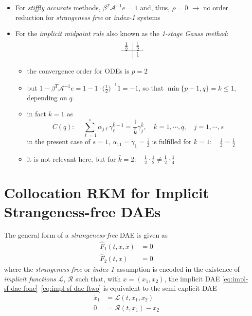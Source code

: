 \documentclass[]{book}
\providecommand{\tightlist}{%
  \setlength{\itemsep}{0pt}\setlength{\parskip}{0pt}}
\theoremstyle{definition}
\theoremstyle{definition}
\theoremstyle{definition}
\theoremstyle{remark}
\begin{document}
\begin{itemize}
\item
  For \emph{stiffly accurate} methods, \(\beta^T \mathcal A^{-1}e=1\) and, thus, \(\rho=0\) \(\rightarrow\) no order reduction for \emph{strangeness free} or \emph{index-1} systems
\item
  For the \emph{implicit midpoint rule} also known as the \emph{1-stage Gauss method}:
  \[
  \begin{array}{c|c}
  \frac 12 & \frac 12 \\
  \hline
   & 1  
  \end{array}
  \]

  \begin{itemize}
  \tightlist
  \item
    the convergence order for ODEs is \(p=2\)
  \item
    but \(1-\beta^T \mathcal A^{-1}e = 1- 1\cdot {\bigl(\frac 12\bigr)}^{-1} 1 = -1\), so that \(\min\{p-1, q\} = k \leq 1\), depending on \(q\).
  \item
    in fact \(k=1\) as
    \[
    C(q): \quad \sum_{\ell=1}^s\alpha_{j\ell}\gamma_\ell^{\bar k-1}=\frac{1}{\bar k} \gamma_j^{\bar k}, \quad {\bar k}=1,\cdots,q, \quad j=1,\cdots,s
    \]
    in the present case of \(s=1\), \(\alpha_{11}=\gamma_1=\frac 12\) is fulfilled for \({\bar k}=1: \quad \frac 12 = \frac 12\)
  \item
    it is not relevant here, but for \({\bar k}=2:\quad \frac 12 \cdot \frac 12 \neq \frac 12 \cdot \frac 14\)
  \end{itemize}
\end{itemize}

\hypertarget{collocation-rkm-for-implicit-strangeness-free-daes}{%
\section{Collocation RKM for Implicit Strangeness-free DAEs}\label{collocation-rkm-for-implicit-strangeness-free-daes}}

The general form of a \emph{strangeness-free} DAE is given as
\begin{align}
\hat F_1(t,x,\dot x) &= 0 \label{eq:impl-sf-dae-fone}\\
\hat F_2(t,x) &= 0 \label{eq:impl-sf-dae-ftwo}
\end{align}
where the \emph{strangeness-free} or \emph{index-1} assumption is encoded in the existence of \emph{implicit functions} \(\mathcal L\), \(\mathcal R\) such that, with \(x=(x_1,x_2)\), the implicit DAE \eqref{eq:impl-sf-dae-fone}--\eqref{eq:impl-sf-dae-ftwo} is equivalent to the semi-explicit DAE
\begin{align*}
  \dot x_1  &= \mathcal L(t,x_1,x_2) \\
   0 &= \mathcal R(t,x_1) -x_2
\end{align*}
\end{document}
